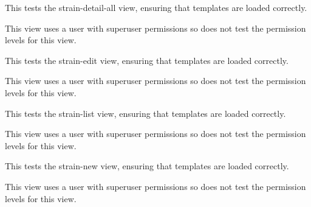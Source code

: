 \documentclass[letterpaper,10pt,english]{sphinxmanual}
\begin{document}
\begin{fulllineitems}
\begin{fulllineitems}
\end{fulllineitems}



\begin{fulllineitems}
\label{api:mousedb.animal.tests.StrainViewTests.test_strain_detail_all}
This tests the strain-detail-all view, ensuring that templates are loaded correctly.

This view uses a user with superuser permissions so does not test the permission levels for this view.

\end{fulllineitems}



\begin{fulllineitems}
\label{api:mousedb.animal.tests.StrainViewTests.test_strain_edit}
This tests the strain-edit view, ensuring that templates are loaded correctly.

This view uses a user with superuser permissions so does not test the permission levels for this view.

\end{fulllineitems}



\begin{fulllineitems}
\label{api:mousedb.animal.tests.StrainViewTests.test_strain_list}
This tests the strain-list view, ensuring that templates are loaded correctly.

This view uses a user with superuser permissions so does not test the permission levels for this view.

\end{fulllineitems}



\begin{fulllineitems}
\label{api:mousedb.animal.tests.StrainViewTests.test_strain_new}
This tests the strain-new view, ensuring that templates are loaded correctly.

This view uses a user with superuser permissions so does not test the permission levels for this view.

\end{fulllineitems}


\end{fulllineitems}
\end{document}

